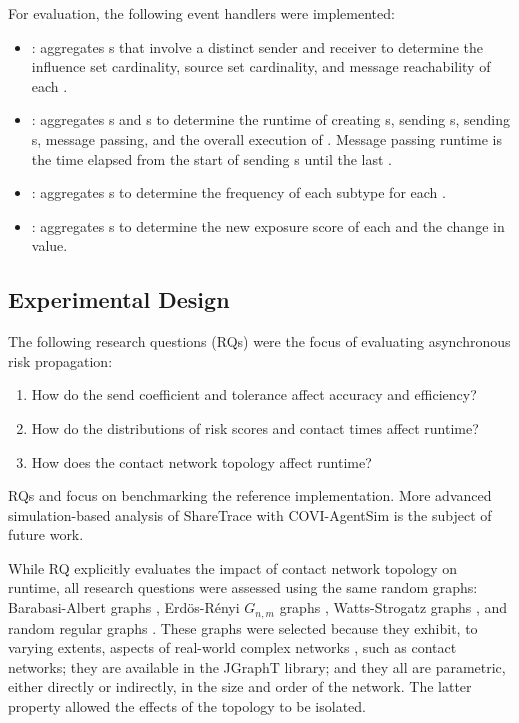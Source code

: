 For evaluation, the following event handlers were implemented:

\begin{itemize}
  \item {}: aggregates s that involve a distinct sender and receiver to determine the influence set cardinality, source set cardinality, and message reachability of each .
  \item {}: aggregates s and s to determine the runtime of creating s, sending s, sending s, message passing, and the overall execution of . Message passing runtime is the time elapsed from the start of sending s until the last .
  \item {}: aggregates s to determine the frequency of each subtype for each .
  \item {}: aggregates s to determine the new exposure score of each  and the change in value.
\end{itemize}

\subsection{Experimental Design}

The following research questions (RQs) were the focus of evaluating asynchronous risk propagation:
\begin{enumerate}
  \item How do the send coefficient and tolerance affect accuracy and efficiency? \label{rq:parameters}
  \item How do the distributions of risk scores and contact times affect runtime? \label{rq:distributions}
  \item How does the contact network topology affect runtime? \label{rq:topology}
\end{enumerate}
RQs  and  focus on benchmarking the reference implementation. More advanced simulation-based analysis of ShareTrace with COVI-AgentSim \citep{Gupta2020} is the subject of future work.

While RQ  explicitly evaluates the impact of contact network topology on runtime, all research questions were assessed using the same random graphs: Barabasi-Albert graphs \citep{Barabasi1999}, Erd\"{o}s-R\'{e}nyi $G_{n,m}$ graphs \citep{Erdos1959}, Watts-Strogatz graphs \citep{Watts1998}, and random regular graphs \citep{Kim2003}. These graphs were selected because they exhibit, to varying extents, aspects of real-world complex networks \citep{Newman2003}, such as contact networks; they are available in the JGraphT library; and they all are parametric, either directly or indirectly, in the size and order of the network. The latter property allowed the effects of the topology to be isolated.

